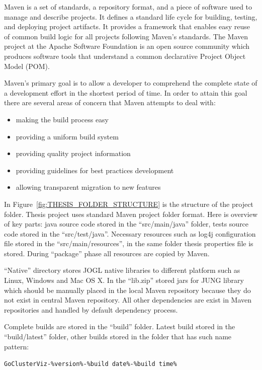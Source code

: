Maven is a set of standards, a repository format, and a piece of software used to manage and describe projects.
It defines a standard life cycle for building, testing, and deploying project artifacts.
It provides a framework that enables easy reuse of common build logic for all projects following Maven's standards.
The Maven project at the Apache Software Foundation is an open source community which produces software tools that
understand a common declarative Project Object Model (POM).~\cite{MAVEN_BOOK_2}


Maven's primary goal is to allow a developer to comprehend the complete state of a development effort in the shortest period of time. In order to attain this goal there are several areas of concern that Maven attempts to deal with:
\begin{itemize}
	\item making the build process easy
	\item providing a uniform build system
	\item providing quality project information
	\item providing guidelines for best practices development
	\item allowing transparent migration to new features
\end{itemize}


In Figure~\ref{fig:THESIS_FOLDER_STRUCTURE} is the structure of the project folder. Thesis project uses standard Maven project folder format. Here is overview of key parts: java source code stored in the ``src/main/java'' folder, tests source code stored in the ``src/test/java''. Necessary resources such as log4j configuration file stored in the ``src/main/resources'', in the same folder thesis properties file is stored. During ``package'' phase all resources are copied by Maven.


``Native'' directory stores JOGL native libraries to different platform such as Linux, Windows and Mac OS X. In the ``lib.zip'' stored jars for JUNG library which should be manually placed in the local Maven repository because they do not  exist in central Maven repository. All other dependencies are exist in Maven repositories and handled by default dependency process.


Complete builds are stored in the ``build'' folder. Latest build stored in the ``build/latest'' folder, other builds stored in the folder that has such name pattern:


\texttt{GoClusterViz-\%version\%-\%build date\%-\%build time\%}


